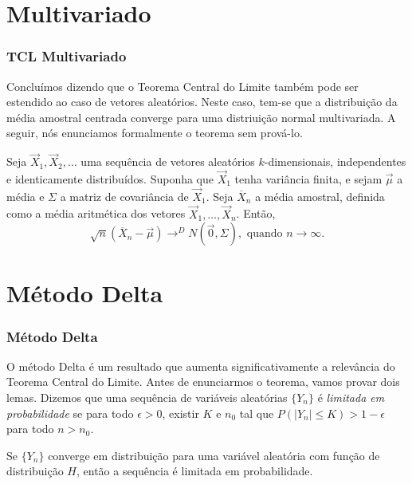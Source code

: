 \section{Multivariado}
\begin{frame}
\frametitle{\textbf{TCL Multivariado}}

Concluímos dizendo que o Teorema Central do Limite também pode ser
estendido ao caso de vetores aleatórios. Neste caso, tem-se que a
distribuição da média amostral centrada converge para uma
distriuição normal multivariada. A seguir, nós enunciamos
formalmente o teorema sem prová-lo.

\begin{teo}
Seja $\vec{X}_1,\vec{X}_2,\ldots$ uma sequência de vetores
aleatórios $k$-dimensionais, independentes e identicamente
distribuídos. Suponha que $\vec{X}_1$ tenha variância finita, e
sejam $\vec{\mu}$ a média e $\Sigma$ a matriz de covariância de
$\vec{X}_1$. Seja $\overline{X}_n$ a média amostral, definida como a
média aritmética dos vetores $\vec{X}_1,\ldots,\vec{X}_n$. Então,
$$\sqrt{n}(\overline{X}_n-\vec{\mu})\rightarrow^D N(\vec{0},\Sigma),\mbox{ quando }n\rightarrow\infty.$$
\end{teo}

\end{frame}

\section{Método Delta}
\begin{frame}
\frametitle{\textbf{Método Delta}}

O método Delta é um resultado que aumenta significativamente a
relevância do Teorema Central do Limite. Antes de enunciarmos o
teorema, vamos provar dois lemas. Dizemos que uma sequência de
variáveis aleatórias $\{Y_n\}$ é {\em limitada em probabilidade} se
para todo $\epsilon>0$, existir $K$ e $n_0$ tal que $P(|Y_n|\leq
K)>1-\epsilon$ para todo $n>n_0$.

\begin{lema} \label{lem:delta1} Se $\{Y_n\}$ converge em distribuição para
uma variável aleatória com função de distribuição $H$, então a
sequência é limitada em probabilidade. \end{lema}


\end{frame}

